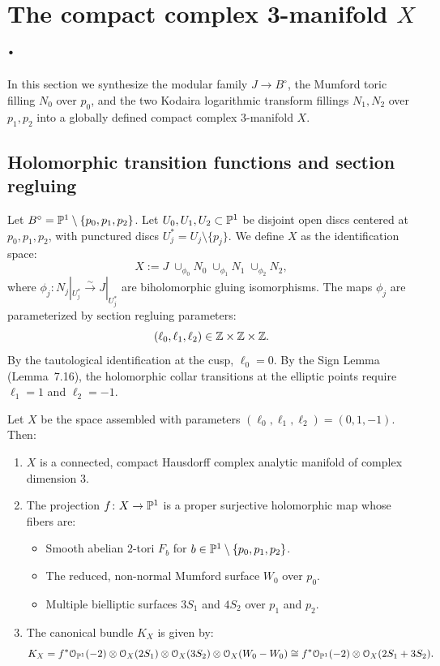 \section{The compact complex 3-manifold $X$.}

In this section we synthesize the modular family $J \to B^\circ$, the Mumford toric filling $N_0$ over $p_0$, and the two Kodaira logarithmic transform fillings $N_1, N_2$ over $p_1, p_2$ into a globally defined compact complex $3$-manifold $X$.

\subsection{Holomorphic transition functions and section regluing}

\begin{construction}\label{const:assembled-manifold}
Let $B^\circ = \mathbb{P}^1 \setminus \{p_0, p_1, p_2\}$. Let $U_0, U_1, U_2 \subset \mathbb{P}^1$ be disjoint open discs centered at $p_0, p_1, p_2$, with punctured discs $U_j^* = U_j \setminus \{p_j\}$.
We define $X$ as the identification space:
\[
X := J \;\cup_{\phi_0} N_0 \;\cup_{\phi_1} N_1 \;\cup_{\phi_2} N_2,
\]
where $\phi_j \colon N_j|_{U_j^*} \xrightarrow{\sim} J|_{U_j^*}$ are biholomorphic gluing isomorphisms.
The maps $\phi_j$ are parameterized by section regluing parameters:
\[
(\ell_0, \ell_1, \ell_2) \in \mathbb{Z} \times \mathbb{Z} \times \mathbb{Z}.
\]
By the tautological identification at the cusp, $\ell_0 = 0$.
By the Sign Lemma (Lemma~7.16), the holomorphic collar transitions at the elliptic points require $\ell_1 = 1$ and $\ell_2 = -1$.
\end{construction}

\begin{theorem}\label{thm:manifold-X-compact}
Let $X$ be the space assembled with parameters $(\ell_0, \ell_1, \ell_2) = (0, 1, -1)$. Then:
\begin{enumerate}[label=(\roman*)]
    \item $X$ is a connected, compact Hausdorff complex analytic manifold of complex dimension $3$.
    \item The projection $f \colon X \to \mathbb{P}^1$ is a proper surjective holomorphic map whose fibers are:
    \begin{itemize}
        \item Smooth abelian $2$-tori $F_b$ for $b \in \mathbb{P}^1 \setminus \{p_0, p_1, p_2\}$.
        \item The reduced, non-normal Mumford surface $W_0$ over $p_0$.
        \item Multiple bielliptic surfaces $3S_1$ and $4S_2$ over $p_1$ and $p_2$.
    \end{itemize}
    \item The canonical bundle $K_X$ is given by:
    \[
    K_X = f^*\mathcal{O}_{\mathbb{P}^1}(-2) \otimes \mathcal{O}_X(2S_1) \otimes \mathcal{O}_X(3S_2) \otimes \mathcal{O}_X(W_0 - W_0) \cong f^*\mathcal{O}_{\mathbb{P}^1}(-2) \otimes \mathcal{O}_X(2S_1 + 3S_2).
    \]
\end{enumerate}
\end{theorem}
